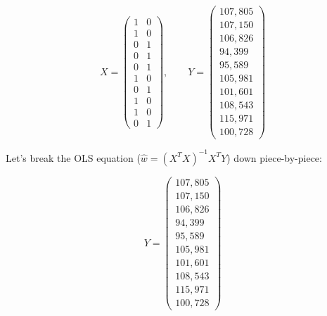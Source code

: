 \[
X = \left(\begin{array}{cc}
          1  &  0 \\ 
          1  &  0 \\ 
          0  &  1 \\ 
          0  &  1 \\ 
          0  &  1 \\ 
          1  &  0 \\ 
          0  &  1 \\ 
          1  &  0 \\ 
          1  &  0 \\ 
          0  &  1
\end{array}\right)
,
\quad\quad
Y = \left(\begin{array}{c}
         107,805 \\ 
         107,150 \\ 
         106,826 \\ 
          94,399 \\ 
          95,589 \\ 
         105,981 \\ 
         101,601 \\ 
         108,543 \\ 
         115,971 \\ 
         100,728 
\end{array}\right)
\] 

Let's break the OLS equation ($\hat{w} = (X^T X)^{-1} X^T Y $) down
piece-by-piece:

\[
Y = \left(\begin{array}{c}
         107,805 \\ 
         107,150 \\ 
         106,826 \\ 
          94,399 \\ 
          95,589 \\ 
         105,981 \\ 
         101,601 \\ 
         108,543 \\ 
         115,971 \\ 
         100,728 
\end{array}\right)
\] 





